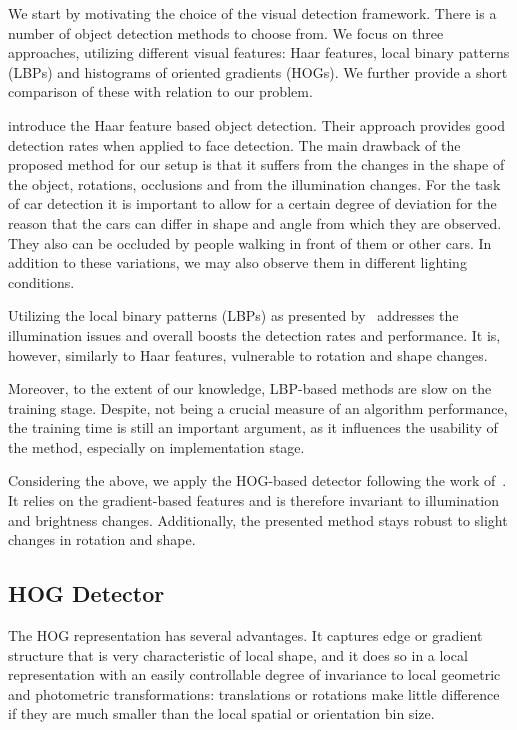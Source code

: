 We start by motivating the choice of the visual detection framework. There is
a number of object detection methods to choose from. We focus on three
approaches, utilizing different visual features: Haar features, local binary
patterns (LBPs) and histograms of oriented gradients (HOGs). We further
provide a short comparison of these with relation to our problem.

\citet{violajones2001} introduce the Haar feature based object detection.
Their approach provides good detection rates when applied to face detection.
The main drawback of the proposed method for our setup is that it suffers from
the changes in the shape of the object, rotations, occlusions and from the
illumination changes. For the task of car detection it is important to allow
for a certain degree of deviation for the reason that the cars can differ in
shape and angle from which they are observed. They also can be occluded by
people walking in front of them or other cars. In addition to these
variations, we may also observe them in different lighting conditions.

Utilizing the local binary patterns (LBPs) as presented by~\citet{lbp2010}
addresses the illumination issues and overall boosts the detection rates and
performance. It is, however, similarly to Haar features, vulnerable to
rotation and shape changes.

Moreover, to the extent of our knowledge, LBP-based methods are slow on the
training stage. Despite, not being a crucial measure of an algorithm
performance, the training time is still an important argument, as it
influences the usability of the method, especially on implementation stage.

Considering the above, we apply the HOG-based detector following the work
of~\citet{dalal2005}. It relies on the gradient-based features and is
therefore invariant to illumination and brightness changes. Additionally, the
presented method stays robust to slight changes in rotation and shape.

\subsection{HOG Detector}\label{sub:hog_detector}

The HOG representation has several advantages. It captures edge or
gradient structure that is very characteristic of local shape, and it does
so in a local representation with an easily controllable degree of
invariance to local geometric and photometric transformations:
translations or rotations make little difference if they are much smaller
than the local spatial or orientation bin size.

